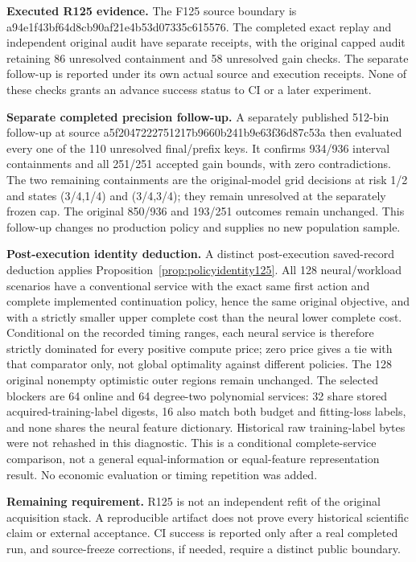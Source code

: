 \noindent\textbf{Executed R125 evidence.} The F125 source boundary is a94e1f43bf64d8cb90af21e4b53d07335c615576. The completed exact replay and independent original audit have separate receipts, with the original capped audit retaining 86 unresolved containment and 58 unresolved gain checks. The separate follow-up is reported under its own actual source and execution receipts. None of these checks grants an advance success status to CI or a later experiment.

\noindent\textbf{Separate completed precision follow-up.} A separately published 512-bin follow-up at source a5f2047222751217b9660b241b9e63f36d87c53a then evaluated every one of the 110 unresolved final/prefix keys. It confirms 934/936 interval containments and all 251/251 accepted gain bounds, with zero contradictions. The two remaining containments are the original-model grid decisions at risk 1/2 and states (3/4,1/4) and (3/4,3/4); they remain unresolved at the separately frozen cap. The original 850/936 and 193/251 outcomes remain unchanged. This follow-up changes no production policy and supplies no new population sample.

\noindent\textbf{Post-execution identity deduction.} A distinct post-execution saved-record deduction applies Proposition~\ref{prop:policyidentity125}. All 128 neural/workload scenarios have a conventional service with the exact same first action and complete implemented continuation policy, hence the same original objective, and with a strictly smaller upper complete cost than the neural lower complete cost. Conditional on the recorded timing ranges, each neural service is therefore strictly dominated for every positive compute price; zero price gives a tie with that comparator only, not global optimality against different policies. The 128 original nonempty optimistic outer regions remain unchanged. The selected blockers are 64 online and 64 degree-two polynomial services: 32 share stored acquired-training-label digests, 16 also match both budget and fitting-loss labels, and none shares the neural feature dictionary. Historical raw training-label bytes were not rehashed in this diagnostic. This is a conditional complete-service comparison, not a general equal-information or equal-feature representation result. No economic evaluation or timing repetition was added.

\noindent\textbf{Remaining requirement.} R125 is not an independent refit of the original acquisition stack. A reproducible artifact does not prove every historical scientific claim or external acceptance. CI success is reported only after a real completed run, and source-freeze corrections, if needed, require a distinct public boundary.

